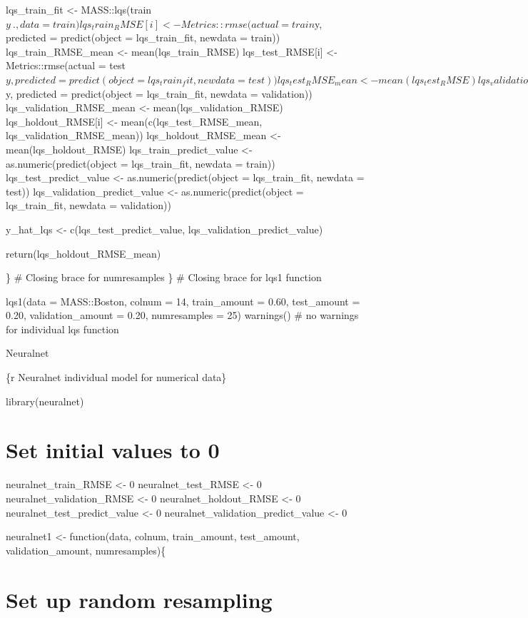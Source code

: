 \documentclass[
]{book}
\begin{document}
lqs\_train\_fit \textless- MASS::lqs(train\(y ~ ., data = train)
lqs_train_RMSE[i] <- Metrics::rmse(actual = train\)y, predicted =
predict(object = lqs\_train\_fit, newdata = train)) lqs\_train\_RMSE\_mean
\textless- mean(lqs\_train\_RMSE) lqs\_test\_RMSE{[}i{]} \textless- Metrics::rmse(actual =
test\(y, predicted = predict(object = lqs_train_fit, newdata = test))
lqs_test_RMSE_mean <- mean(lqs_test_RMSE)
lqs_validation_RMSE[i] <- Metrics::rmse(actual = validation\)y, predicted
= predict(object = lqs\_train\_fit, newdata = validation))
lqs\_validation\_RMSE\_mean \textless- mean(lqs\_validation\_RMSE)
lqs\_holdout\_RMSE{[}i{]} \textless- mean(c(lqs\_test\_RMSE\_mean,
lqs\_validation\_RMSE\_mean)) lqs\_holdout\_RMSE\_mean \textless-
mean(lqs\_holdout\_RMSE) lqs\_train\_predict\_value \textless-
as.numeric(predict(object = lqs\_train\_fit, newdata = train))
lqs\_test\_predict\_value \textless- as.numeric(predict(object = lqs\_train\_fit,
newdata = test)) lqs\_validation\_predict\_value \textless-
as.numeric(predict(object = lqs\_train\_fit, newdata = validation))

y\_hat\_lqs \textless- c(lqs\_test\_predict\_value, lqs\_validation\_predict\_value)

return(lqs\_holdout\_RMSE\_mean)

\} \# Closing brace for numresamples \} \# Closing brace for lqs1 function

lqs1(data = MASS::Boston, colnum = 14, train\_amount = 0.60, test\_amount
= 0.20, validation\_amount = 0.20, numresamples = 25) warnings() \# no
warnings for individual lqs function

Neuralnet

\{r Neuralnet individual model for numerical data\}

library(neuralnet)

\chapter{Set initial values to 0}\label{set-initial-values-to-0-11}

neuralnet\_train\_RMSE \textless- 0 neuralnet\_test\_RMSE \textless- 0
neuralnet\_validation\_RMSE \textless- 0 neuralnet\_holdout\_RMSE \textless- 0
neuralnet\_test\_predict\_value \textless- 0 neuralnet\_validation\_predict\_value
\textless- 0

neuralnet1 \textless- function(data, colnum, train\_amount, test\_amount,
validation\_amount, numresamples)\{

\chapter{Set up random resampling}\label{set-up-random-resampling-9}
\end{document}
